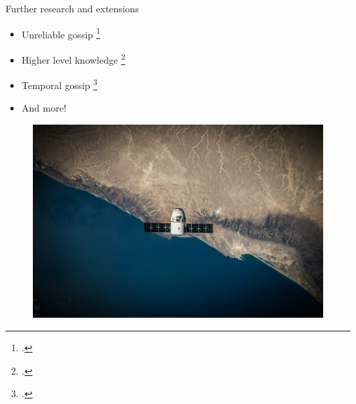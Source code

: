 \documentclass[aspectratio=169]{beamer}
\begin{document}
\begin{frame}[c]{Further research and extensions}
    \begin{multicols}{2}
        \begin{itemize}
            \item<1-> Unreliable gossip \footcite{martins_dealing_2020}
            \item<2-> Higher level knowledge \footcite{herzig_how_2017}
            \item<3-> Temporal gossip \footcite{slavkovik_temporal_2019}
            \item<4-> And more!
        \end{itemize}
        \columnbreak
        \begin{figure}
            \centering
            \includegraphics[width=\linewidth]{images/sattelite.jpg}
        \end{figure}
    \end{multicols}
\end{frame}
\end{document}
